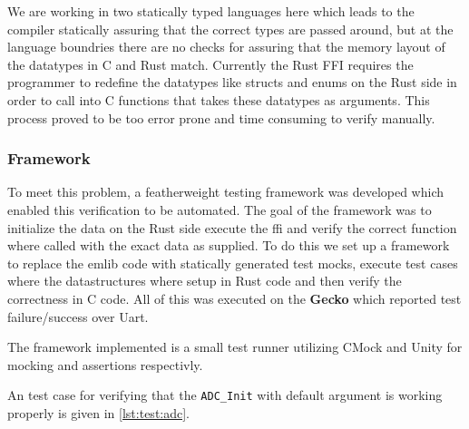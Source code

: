 We are working in two statically typed languages here which leads to the compiler statically assuring that the correct types are passed around, but at the language boundries there are no checks for assuring that the memory layout of the datatypes in C and Rust match.
Currently the Rust FFI requires the programmer to redefine the datatypes like structs and enums on the Rust side in order to call into C functions that takes these datatypes as arguments.
This process proved to be too error prone and time consuming to verify manually.

\subsubsection{Framework}

To meet this problem, a featherweight testing framework was developed which enabled this verification to be automated.
The goal of the framework was to initialize the data on the Rust side execute the \gls{ffi} and verify the correct function where called with the exact data as supplied.
To do this we set up a framework to replace the emlib code with statically generated test mocks, execute test cases where the datastructures where setup in Rust code and then verify the correctness in C code.
All of this was executed on the \textbf{Gecko} which reported test failure/success over Uart.

The framework implemented is a small test runner utilizing CMock \cite{web:cmock} and Unity \cite{web:unity} for mocking and assertions respectivly.

An test case for verifying that the \texttt{ADC\_Init} with default argument is working properly is given in \autoref{lst:test:adc}.


